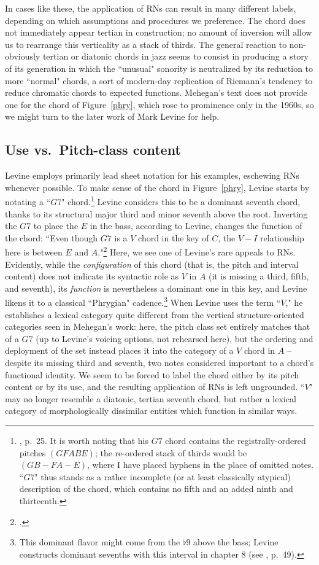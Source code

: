 In cases like these, the application of RNs can result in many different labels, depending on which assumptions and procedures we preference.  The chord does not immediately appear tertian in construction; no amount of inversion will allow us to rearrange this verticality as a stack of thirds.  The general reaction to non-obviously tertian or diatonic chords in jazz seems to consist in producing a story of its generation in which the ``unusual" sonority is neutralized by its reduction to more ``normal" chords, a sort of modern-day replication of Riemann's tendency to reduce chromatic chords to expected functions.  Mehegan's text does not provide one for the chord of Figure~\ref{phry}, which rose to prominence only in the 1960s, so we might turn to the later work of Mark Levine for help.

\subsection{Use vs.\ Pitch-class content}
Levine employs primarily lead sheet notation for his examples, eschewing RNs whenever possible.  To make sense of the chord in Figure~\ref{phry}, Levine starts by notating a ``$G7$" chord.\footnote{\cite{levine1989}, p.\ 25.  It is worth noting that his $G7$ chord contains the registrally-ordered pitches $(GFABE)$; the re-ordered stack of thirds would be $(GB-FA-E)$, where I have placed hyphens in the place of omitted notes.  ``$G7$" thus stands as a rather incomplete (or at least classically atypical) description of the chord, which contains no fifth and an added ninth and thirteenth.}  Levine considers this to be a dominant seventh chord, thanks to its structural major third and minor seventh above the root.  Inverting the $G7$ to place the $E$ in the bass, according to Levine, changes the function of the chord: ``Even though $G7$ is a $V$ chord in the key of $C$, the $V-I$ relationship here is between $E$ and $A$."\footnote{\cite{levine1989}.}  Here, we see one of Levine's rare appeals to RNs.  Evidently, while the \emph{configuration} of this chord (that is, the pitch and interval content) does not indicate its syntactic role as $V$ in $A$ (it is missing a third, fifth, and seventh), its \emph{function} is nevertheless a dominant one in this key, and Levine likens it to a classical ``Phrygian" cadence.\footnote{This dominant flavor might come from the $\flat$9 above the bass; Levine constructs dominant sevenths with this interval in chapter 8 (see \cite{levine1989}, p.\ 49).}  When Levine uses the term ``$V$," he establishes a lexical category quite different from the vertical structure-oriented categories seen in Mehegan's work: here, the pitch class set entirely matches that of a $G7$ (up to Levine's voicing options, not rehearsed here), but the ordering and deployment of the set instead places it into the category of a $V$ chord in $A$ -- despite its missing third and seventh, two notes considered important to a chord's functional identity.  We seem to be forced to label the chord either by its pitch content or by its use, and the resulting application of RNs is left ungrounded.  ``$V$" may no longer resemble a diatonic, tertian seventh chord, but rather a lexical category of morphologically dissimilar entities which function in similar ways.

